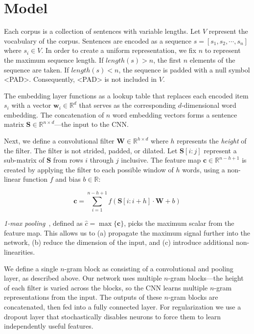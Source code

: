 \documentclass{article}
\begin{document}
\section{Model}

Each corpus is a collection of sentences with variable lengths. Let $V$ represent the vocabulary of the corpus. Sentences are encoded as a sequence $s = [s_1, s_2, \cdots, s_n]$ where $s_i \in V$. In order to create a uniform representation, we fix $n$ to represent the maximum sequence length. If $length(s) > n$, the first $n$ elements of the sequence are taken. If $length(s) < n$, the sequence is padded with a null symbol <PAD>. Consequently, <PAD> is not included in $V$.

The embedding layer functions as a lookup table that replaces each encoded item $s_i$ with a vector $\mathbf{w}_i \in \mathbb{R}^d$ that serves as the corresponding $d$-dimensional word embedding. The concatenation of $n$ word embedding vectors forms a sentence matrix $\mathbf{S} \in \mathbb{R}^{n \times d}$---the input to the CNN.

Next, we define a convolutional filter $\mathbf{W} \in \mathbb{R}^{h \times d}$ where $h$ represents the \textit{height} of the filter. The filter is not strided, padded, or dilated. Let $\mathbf{S}[i:j]$ represent a sub-matrix of $\mathbf{S}$ from rows $i$ through $j$ inclusive. The feature map $\mathbf{c} \in \mathbb{R}^{n - h + 1}$ is created by applying the filter to each possible window of $h$ words, using a non-linear function $f$ and bias $b \in \mathbb{R}$:

\begin{equation}
    \mathbf{c} = \sum_{i=1}^{n-h+1} f(\mathbf{S}[i:i+h] \cdot \mathbf{W} + b)
\end{equation}

\textit{1-max pooling}~\cite{pooling}, defined as $\hat{c} = \max \{\mathbf{c}\}$, picks the maximum scalar from the feature map. This allows us to (a) propagate the maximum signal further into the network, (b) reduce the dimension of the input, and (c) introduce additional non-linearities.

We define a single $n$-gram block as consisting of a convolutional and pooling layer, as described above. Our network uses multiple $n$-gram blocks---the height of each filter is varied across the blocks, so the CNN learns multiple $n$-gram representations from the input. The outputs of these $n$-gram blocks are concatenated, then fed into a fully connected layer. For regularization we use a dropout layer that stochastically disables neurons to force them to learn independently useful features.
\end{document}
